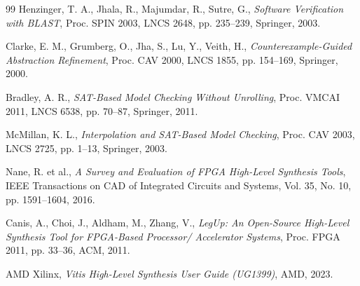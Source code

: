 ﻿\documentclass[12pt,a4paper]{report}
\begin{document}
\begin{thebibliography}{99}
  Henzinger, T. A., Jhala, R., Majumdar, R., Sutre, G.,
  \textit{Software Verification with BLAST},
  Proc. SPIN 2003, LNCS 2648, pp. 235--239, Springer, 2003.

  Clarke, E. M., Grumberg, O., Jha, S., Lu, Y., Veith, H.,
  \textit{Counterexample-Guided Abstraction Refinement},
  Proc. CAV 2000, LNCS 1855, pp. 154--169, Springer, 2000.

  Bradley, A. R.,
  \textit{SAT-Based Model Checking Without Unrolling},
  Proc. VMCAI 2011, LNCS 6538, pp. 70--87, Springer, 2011.

  McMillan, K. L.,
  \textit{Interpolation and SAT-Based Model Checking},
  Proc. CAV 2003, LNCS 2725, pp. 1--13, Springer, 2003.

  Nane, R. et al.,
  \textit{A Survey and Evaluation of FPGA High-Level Synthesis Tools},
  IEEE Transactions on CAD of Integrated Circuits and Systems, Vol. 35, No. 10,
  pp. 1591--1604, 2016.

  Canis, A., Choi, J., Aldham, M., Zhang, V.,
  \textit{LegUp: An Open-Source High-Level Synthesis Tool for FPGA-Based Processor/
  Accelerator Systems},
  Proc. FPGA 2011, pp. 33--36, ACM, 2011.

  AMD Xilinx,
  \textit{Vitis High-Level Synthesis User Guide (UG1399)},
  AMD, 2023.

\end{thebibliography}
\end{document}
